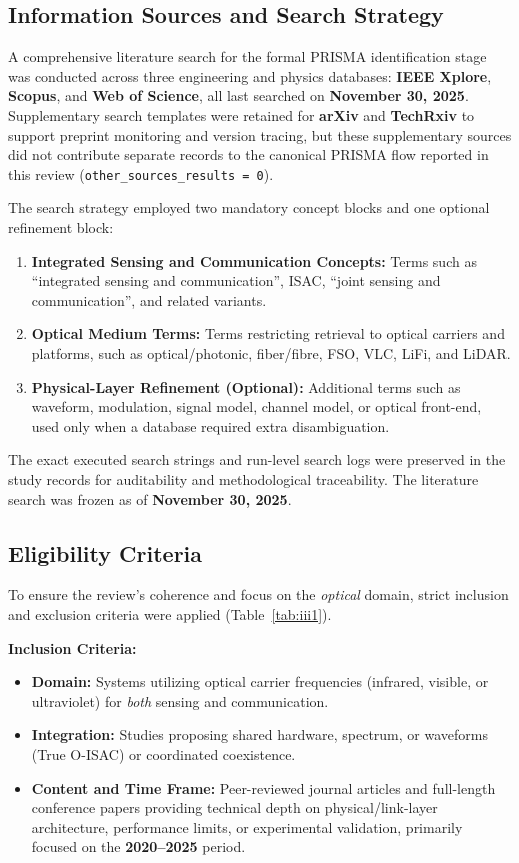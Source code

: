 \documentclass[lettersize,journal]{IEEEtran}
\begin{document}
\subsection{Information Sources and Search Strategy}
A comprehensive literature search for the formal PRISMA identification stage was conducted across three engineering and physics databases: \textbf{IEEE Xplore}, \textbf{Scopus}, and \textbf{Web of Science}, all last searched on \textbf{November 30, 2025}. Supplementary search templates were retained for \textbf{arXiv} and \textbf{TechRxiv} to support preprint monitoring and version tracing, but these supplementary sources did not contribute separate records to the canonical PRISMA flow reported in this review (\texttt{other\_sources\_results = 0}).

The search strategy employed two mandatory concept blocks and one optional refinement block:
\begin{enumerate}
    \item \textbf{Integrated Sensing and Communication Concepts:} Terms such as ``integrated sensing and communication'', ISAC, ``joint sensing and communication'', and related variants.
    \item \textbf{Optical Medium Terms:} Terms restricting retrieval to optical carriers and platforms, such as optical/photonic, fiber/fibre, FSO, VLC, LiFi, and LiDAR.
    \item \textbf{Physical-Layer Refinement (Optional):} Additional terms such as waveform, modulation, signal model, channel model, or optical front-end, used only when a database required extra disambiguation.
\end{enumerate}

The exact executed search strings and run-level search logs were preserved in the study records for auditability and methodological traceability. The literature search was frozen as of \textbf{November 30, 2025}.

\subsection{Eligibility Criteria}
To ensure the review's coherence and focus on the \textit{optical} domain, strict inclusion and exclusion criteria were applied (Table~\ref{tab:iii1}).

\textbf{Inclusion Criteria:}
\begin{itemize}
    \item \textbf{Domain:} Systems utilizing optical carrier frequencies (infrared, visible, or ultraviolet) for \textit{both} sensing and communication.
    \item \textbf{Integration:} Studies proposing shared hardware, spectrum, or waveforms (True O-ISAC) or coordinated coexistence.
    \item \textbf{Content and Time Frame:} Peer-reviewed journal articles and full-length conference papers providing technical depth on physical/link-layer architecture, performance limits, or experimental validation, primarily focused on the \textbf{2020--2025} period.
\end{itemize}
\end{document}
